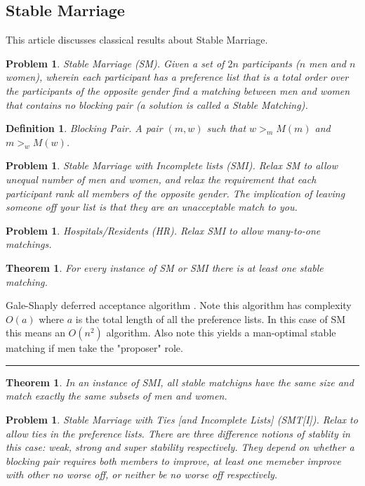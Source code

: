 \documentclass{article}
\newtheorem{theorem}[fact]{Theorem}
\newtheorem{definition}[fact]{Definition}
\newtheorem{problem}[fact]{Problem}
\newenvironment{proof}{{\bf Proof:  }}{\hfill\rule{2mm}{2mm}}
\begin{document}
\subsection{Stable Marriage}
This article \cite{irving2008stable} discusses classical results about Stable Marriage.
\begin{problem}
Stable Marriage (SM). Given a set of $2n$ participants ($n$ men and $n$ women), wherein each participant has a preference list that is a total order over the participants of the opposite gender find a matching between men and women that contains no blocking pair (a solution is called a Stable Matching).
\end{problem}
\begin{definition}
Blocking Pair. A pair $(m,w)$ such that $w >_m M(m)$ and $ m >_w M(w)$.
\end{definition}
\begin{problem}
Stable Marriage with Incomplete lists (SMI). Relax SM to allow unequal number of men and women, and relax the requirement that each participant rank all members of the opposite gender. The implication of leaving someone off your list is that they are an unacceptable match to you.
\end{problem}
\begin{problem}
Hospitals/Residents (HR). Relax SMI to allow many-to-one matchings.
\end{problem}
\begin{theorem}
For every instance of SM or SMI there is at least one stable matching.
\end{theorem}
\begin{proof}
Gale-Shaply deferred acceptance algorithm \cite{gale1962college}. Note this algorithm has complexity $O(a)$ where $a$ is the total length of all the preference lists. In this case of SM this means an $O(n^2)$ algorithm. Also note this yields a man-optimal stable matching if men take the "proposer" role.
\end{proof}
\begin{theorem}
In an instance of SMI, all stable matchigns have the same size and match exactly the same subsets of men and women.
\end{theorem}
\begin{problem}
Stable Marriage with Ties [and Incomplete Lists] (SMT[I]). Relax to allow ties in the preference lists. There are three difference notions of stablity in this case: weak, strong and super stability respectively. They depend on whether a blocking pair requires both members to improve, at least one memeber improve with other no worse off, or neither be no worse off respectively.  
\end{problem}
\end{document}
